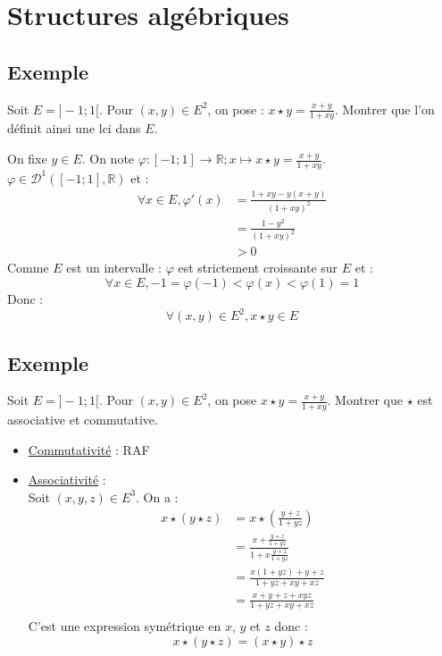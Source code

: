 \documentclass[../main.tex]{subfiles}
\begin{document}
\setcounter{chapter}{9}
\chapter{Structures algébriques}
\tableofcontents
\clearpage

\setcounter{section}{2}
\section{Exemple}

\begin{tcolorbox}[title=Exemple, title filled=false, colframe=darkgreen]
    Soit $E = ]-1 ; 1[$. Pour $(x,y) \in E^2$, on pose : $x \star y = \frac{x + y}{1 + xy}$. Montrer que l'on définit ainsi une lci dans $E$. 
\end{tcolorbox}

On fixe $y \in E$. On note $\varphi:[-1 ; 1] \to \mathbb{R} ; x \mapsto x \star y = \frac{x + y}{1 + xy}$. \\
$\varphi \in \mathcal{D}^1([-1;1], \mathbb{R})$ et : 
\begin{align*}
    \forall x \in E, \varphi'(x) &= \frac{1 + xy -y(x + y)}{(1 + xy)^2} \\
    &= \frac{1 - y^2}{(1 + xy)^2} \\
    &> 0
\end{align*}
Comme $E$ est un intervalle : $\varphi$ est strictement croissante sur $E$ et :
$$\forall x \in E, -1 = \varphi(-1) < \varphi(x) < \varphi(1) = 1$$
Donc : 
$$\forall (x,y) \in E^2, x \star y \in E$$

\setcounter{section}{5}
\section{Exemple}

\begin{tcolorbox}[title=Exemple, title filled=false, colframe=darkgreen]
    Soit $E = ]-1;1[$. Pour $(x,y) \in E^2$, on pose $x \star y = \frac{x + y}{1 + xy}$. Montrer que $\star$ est associative et commutative.
\end{tcolorbox}

\begin{itemize}
    \item \underline{Commutativité} : RAF
    \item \underline{Associativité} : \\
    Soit $(x,y,z) \in E^3$. On a :
    \begin{align*}
        x \star (y \star z) &= x \star \left( \frac{y + z}{1 + yz} \right) \\
        &= \frac{x + \frac{y + z}{1 + yz}}{1 + x \frac{y + z}{1 + yz}} \\
        &= \frac{x(1 + yz) + y + z}{1 + yz + xy + xz} \\
        &= \frac{x + y + z + xyz}{1 + yz + xy + xz} \\
    \end{align*}
    C'est une expression symétrique en $x$, $y$ et $z$ donc :
    $$x \star (y \star z) = (x \star y) \star z$$
\end{itemize}
\end{document}
